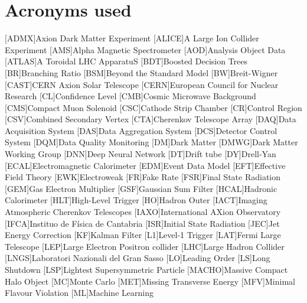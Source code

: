 \documentclass[a4paper, 10pt, openright]{report}
\begin{document}
\chapter*{Acronyms used}
\begin{multicols}{2}
\begin{acronym}

[ADMX]{Axion Dark Matter Experiment}
[ALICE]{A Large Ion Collider Experiment}
[AMS]{Alpha Magnetic Spectrometer}
[AOD]{Analysis Object Data}
[ATLAS]{A Toroidal LHC ApparatuS}
[BDT]{Boosted Decision Trees}
[BR]{Branching Ratio}
[BSM]{Beyond the Standard Model}
[BW]{Breit-Wigner}
[CAST]{CERN Axion Solar Telescope}
[CERN]{European Council for Nuclear Research}
[CL]{Confidence Level}
[CMB]{Cosmic Microwave Background}
[CMS]{Compact Muon Solenoid}
[CSC]{Cathode Strip Chamber}
[CR]{Control Region}
[CSV]{Combined Secondary Vertex}
[CTA]{Cherenkov Telescope Array}
[DAQ]{Data Acquisition System}
[DAS]{Data Aggregation System}
[DCS]{Detector Control System}
[DQM]{Data Quality Monitoring}
[DM]{Dark Matter}
[DMWG]{Dark Matter Working Group}
[DNN]{Deep Neural Network}
[DT]{Drift tube}
[DY]{Drell-Yan}
[ECAL]{Electromagnetic Calorimeter}
[EDM]{Event Data Model}
[EFT]{Effective Field Theory}
[EWK]{Electroweak}
[FR]{Fake Rate}
[FSR]{Final State Radiation}
[GEM]{Gas Electron Multiplier}
[GSF]{Gaussian Sum Filter}
[HCAL]{Hadronic Calorimeter}
[HLT]{High-Level Trigger}
[HO]{Hadron Outer}
[IACT]{Imaging Atmospheric Cherenkov Telescopes}
[IAXO]{International AXion Observatory}
[IFCA]{Instituo de F\'{i}sica de Cantabria}
[ISR]{Initial State Radiation}
[JEC]{Jet Energy Correction}
[KF]{Kalman Filter}
[L1]{Level-1 Trigger}
[LAT]{Fermi Large Telescope}
[LEP]{Large Electron Positron collider}
[LHC]{Large Hadron Collider}
[LNGS]{Laboratori Nazionali del Gran Sasso}
[LO]{Leading Order}
[LS]{Long Shutdown}
[LSP]{Lightest Supersymmetric Particle}
[MACHO]{Massive Compact Halo Object}
[MC]{Monte Carlo}
[MET]{Missing Transverse Energy}
[MFV]{Minimal Flavour Violation}
[ML]{Machine Learning}

\end{acronym}
\end{multicols}
\end{document}
